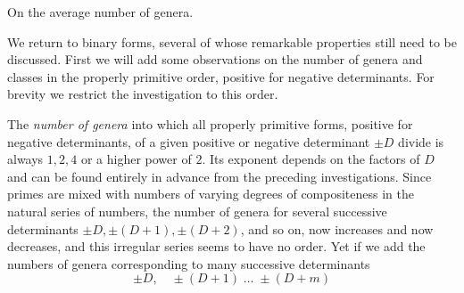 \begin{center}On the average number of genera.\end{center}


We return to binary forms, several of whose remarkable properties still need to be discussed. First we will add some observations on the number of genera and classes in the properly primitive order, positive for negative determinants. For brevity we restrict the investigation to this order.

The \textit{number of genera} into which all properly primitive forms, positive for negative determinants, of a given positive or negative determinant \(\pm D\) divide is always \(1,2,4\) or a higher power of \(2\). Its exponent depends on the factors of \(D\) and can be found entirely in advance from the preceding investigations. Since primes are mixed with numbers of varying degrees of compositeness in the natural series of numbers, the number of genera for several
successive determinants \(\pm D,\pm(D+1),\pm(D+2)\), and so on, now increases and now decreases, and this irregular series seems to have no order. Yet if we add the numbers of genera corresponding to many successive determinants
\[\pm D,\quad\pm(D+1)\;\ldots\;\pm(D+m)\]
